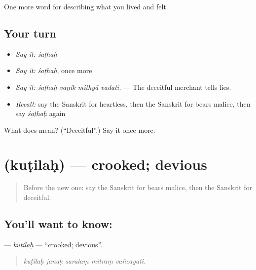 \begin{grammarlens}[title={What you've built}]
One more word for describing what you lived and felt.
\end{grammarlens}

\subsection*{Your turn}
\begin{itemize}
\raggedright
  \item \emph{Say it:} \emph{śaṭhaḥ}
  \item \emph{Say it:} \emph{śaṭhaḥ}, once more
  \item \emph{Say it:} \emph{śaṭhaḥ vaṇik mithyā vadati.} — The deceitful merchant tells lies.
  \item \emph{Recall:} say the Sanskrit for heartless, then the Sanskrit for bears malice, then say \emph{śaṭhaḥ} again
\end{itemize}

\begin{tcolorbox}[breakable,colback=teal!4,colframe=teal!35!black,title={Before you move on}]
What does  mean? (\textquotedblleft{}Deceitful\textquotedblright{}.) Say it once more.
\end{tcolorbox}
\section[\texorpdfstring{\sk{कुटिलः} (kuṭilaḥ)}{कुटिलः (kuṭilaḥ)}]{ (kuṭilaḥ) — crooked; devious}

\label{lesson:SA-C462-kutilah}



\begin{quote}
Before the new one: say the Sanskrit for bears malice, then the Sanskrit for deceitful.
\end{quote}

\subsection*{You'll want to know: }
\textbf{} — \emph{kuṭilaḥ} — \textquotedblleft{}crooked; devious\textquotedblright{}.

\begin{quote}
    
\end{quote}

\begin{quote}
\emph{kuṭilaḥ janaḥ saralaṃ mitraṃ vañcayati.}
\end{quote}

